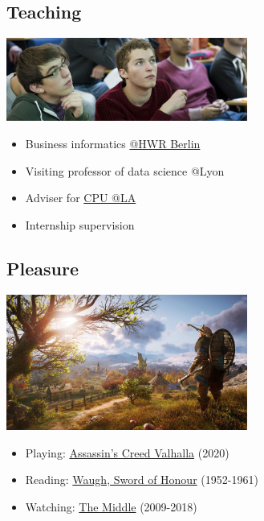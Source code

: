 \documentclass[11pt]{article}
\begin{document}
\subsection*{Teaching}
\label{sec:orgc101cec}

\begin{center}
\includegraphics[width=300px]{./img/teaching.jpeg}
\end{center}

\begin{itemize}
\item Business informatics \href{https://www.hwr-berlin.de/en/}{@HWR Berlin}
\item Visiting professor of data science @Lyon
\item Adviser for \href{https://catholicpolytechnic.org/}{CPU @LA}
\item Internship supervision
\end{itemize}

\subsection*{Pleasure}
\label{sec:org1b89215}

\begin{center}
\includegraphics[width=300px]{./img/valhalla.jpg}
\end{center}

\begin{itemize}
\item Playing: \href{https://en.wikipedia.org/wiki/Assassin\%27s\_Creed\_Valhalla}{Assassin's Creed Valhalla} (2020)
\item Reading: \href{https://en.wikipedia.org/wiki/Sword\_of\_Honour}{Waugh, Sword of Honour} (1952-1961)
\item Watching: \href{https://en.wikipedia.org/wiki/The\_Middle\_(TV\_series)}{The Middle} (2009-2018)
\end{itemize}
\end{document}

